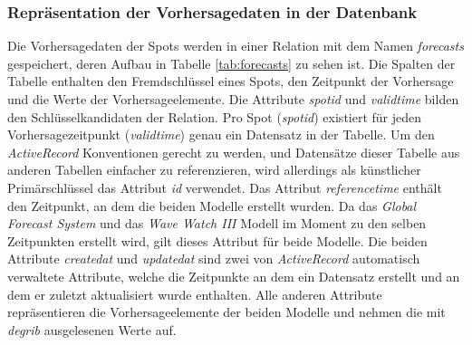 \subsubsection{Repräsentation der Vorhersagedaten in der Datenbank}
Die Vorhersagedaten der Spots werden in einer Relation mit dem Namen
\textit{forecasts} gespeichert, deren Aufbau in Tabelle
\ref{tab:forecasts} zu sehen ist. Die Spalten der Tabelle enthalten
den Fremdschlüssel eines Spots, den Zeitpunkt der Vorhersage und die
Werte der Vorhersageelemente. Die Attribute
\textit{spot\textunderscore id} und \textit{valid\textunderscore time}
bilden den Schlüsselkandidaten der Relation. Pro Spot
(\textit{spot\textunderscore id}) existiert für jeden
Vorhersagezeitpunkt (\textit{valid\textunderscore time}) genau ein
Datensatz in der Tabelle. Um den \textit{ActiveRecord} Konventionen
gerecht zu werden, und Datensätze dieser Tabelle aus anderen Tabellen
einfacher zu referenzieren, wird allerdings als künstlicher
Primärschlüssel das Attribut \textit{id} verwendet. Das Attribut
\textit{reference\textunderscore time} enthält den Zeitpunkt, an dem
die beiden Modelle erstellt wurden. Da das \textit{Global Forecast
  System} und das \textit{Wave Watch III} Modell im Moment zu den
selben Zeitpunkten erstellt wird, gilt dieses Attribut für beide
Modelle. Die beiden Attribute \textit{created\textunderscore at} und
\textit{updated\textunderscore at} sind zwei von \textit{ActiveRecord}
automatisch verwaltete Attribute, welche die Zeitpunkte an dem ein
Datensatz erstellt und an dem er zuletzt aktualisiert wurde
enthalten. Alle anderen Attribute repräsentieren die
Vorhersageelemente der beiden Modelle und nehmen die mit
\textit{degrib} ausgelesenen Werte auf.

